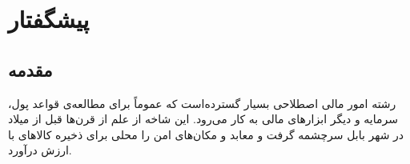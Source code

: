 \documentclass[a4paper,titlepage,12pt,fleqn,oneside]{report}
\begin{document}
	\chapter{پیشگفتار}
	
	\section{مقدمه}
	رشته امور مالی اصطلاحی بسیار گسترده‌است که عموماً برای مطالعه‌ی قواعد پول، سرمایه و دیگر ابزارهای مالی به کار می‌رود. این شاخه از علم از قرن‌ها قبل از میلاد در شهر بابل سرچشمه گرفت و معابد و مکان‌های امن را محلی برای ذخیره کالاهای با ارزش درآورد. 
	
\end{document}
